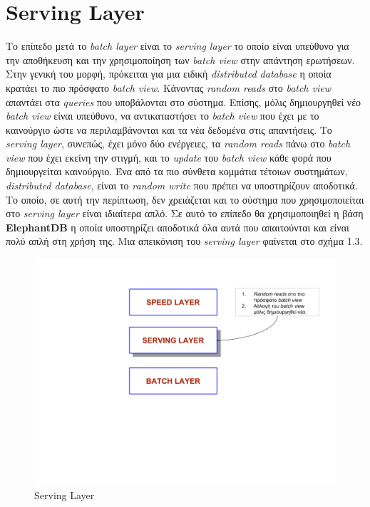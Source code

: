 \section{Serving Layer}
Το επίπεδο μετά το \textit{batch layer} είναι το \textit{serving layer} το οποίο είναι υπεύθυνο για την αποθήκευση και την χρησιμοποίηση των \textit{batch view} στην απάντηση ερωτήσεων. Στην γενική του μορφή, πρόκειται για μια ειδική \textit{distributed database} η οποία κρατάει το πιο πρόσφατο \textit{batch view}. Κάνοντας \textit{random reads} στο \textit{batch view} απαντάει στα \textit{queries} που υποβάλονται στο σύστημα. Επίσης, μόλις δημιουργηθεί νέο \textit{batch view} είναι υπεύθυνο, να αντικαταστήσει το \textit{batch view} που έχει με το καινούργιο ώστε να περιλαμβάνονται και τα νέα δεδομένα στις απαντήσεις.
\newline
Το \textit{serving layer}, συνεπώς, έχει μόνο δύο ενέργειες, τα \textit{random reads} πάνω στο \textit{batch view} που έχει εκείνη την στιγμή, και το \textit{update} του \textit{batch view} κάθε φορά που δημιουργείται καινούργιο. Ένα από τα πιο σύνθετα κομμάτια τέτοιων συστημάτων, \textit{distributed database}, είναι το \textit{random write} που πρέπει να υποστηρίζουν αποδοτικά. Το οποίο, σε αυτή την περίπτωση, δεν χρειάζεται και το σύστημα που χρησιμοποιείται στο  \textit{serving layer} είναι ιδιαίτερα απλό. Σε αυτό το επίπεδο θα χρησιμοποιηθεί η βάση \textbf{ElephantDB} η οποία υποστηρίζει αποδοτικά όλα αυτά που απαιτούνται και είναι πολύ απλή στη χρήση της.
\newline
Μια απεικόνιση του \textit{serving layer} φαίνεται στο σχήμα 1.3.
\begin{figure}[t]
\caption{Serving Layer}
\includegraphics[width=15cm]{images/serving_layer.png}
\centering
\end{figure}
\clearpage


